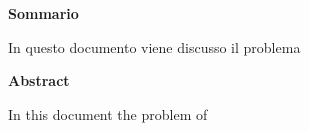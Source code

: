 \begin{center}
    \textbf{Sommario}
\end{center}
In questo documento viene discusso il problema 

\cleardoublepage

\begin{center}
    \textbf{Abstract}
\end{center}
In this document the problem of 

\cleardoublepage